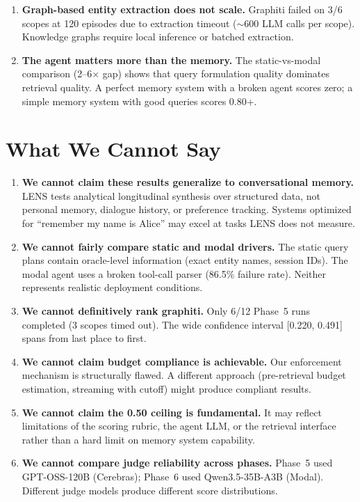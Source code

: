 \documentclass[11pt,letterpaper]{article}
\begin{document}
\begin{enumerate}
  \item \textbf{Graph-based entity extraction does not scale.} Graphiti failed on 3/6 scopes at 120 episodes due to extraction timeout ($\sim$600 LLM calls per scope). Knowledge graphs require local inference or batched extraction.

  \item \textbf{The agent matters more than the memory.} The static-vs-modal comparison (2--6$\times$ gap) shows that query formulation quality dominates retrieval quality. A perfect memory system with a broken agent scores zero; a simple memory system with good queries scores 0.80+.
\end{enumerate}

\section{What We Cannot Say}
\label{sec:caveats}

\begin{enumerate}
  \item \textbf{We cannot claim these results generalize to conversational memory.} LENS tests analytical longitudinal synthesis over structured data, not personal memory, dialogue history, or preference tracking. Systems optimized for ``remember my name is Alice'' may excel at tasks LENS does not measure.

  \item \textbf{We cannot fairly compare static and modal drivers.} The static query plans contain oracle-level information (exact entity names, session IDs). The modal agent uses a broken tool-call parser (86.5\% failure rate). Neither represents realistic deployment conditions.

  \item \textbf{We cannot definitively rank graphiti.} Only 6/12 Phase~5 runs completed (3 scopes timed out). The wide confidence interval [0.220, 0.491] spans from last place to first.

  \item \textbf{We cannot claim budget compliance is achievable.} Our enforcement mechanism is structurally flawed. A different approach (pre-retrieval budget estimation, streaming with cutoff) might produce compliant results.

  \item \textbf{We cannot claim the 0.50 ceiling is fundamental.} It may reflect limitations of the scoring rubric, the agent LLM, or the retrieval interface rather than a hard limit on memory system capability.

  \item \textbf{We cannot compare judge reliability across phases.} Phase~5 used GPT-OSS-120B (Cerebras); Phase~6 used Qwen3.5-35B-A3B (Modal). Different judge models produce different score distributions.
\end{enumerate}
\end{document}
